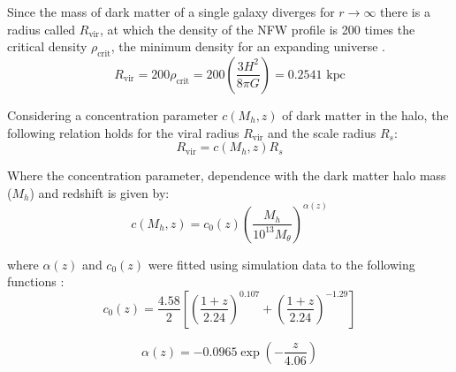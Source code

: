 		
		Since the mass of dark matter of a single galaxy diverges for $r \rightarrow \infty$ there is a radius called $R_\text{vir}$, at which the density of the NFW profile is 200 times the critical density $\rho_\text{crit}$, the minimum density for an expanding universe .
		\begin{equation}
			R_\text{vir} = 200 \rho_\text{crit} = 200 \left(\dfrac{3H^2}{8\pi G}\right) = 0.2541 \text{ kpc}
		\end{equation}
		
		Considering a concentration parameter $c(M_h, z)$ of dark matter in the halo, the following relation holds for the viral radius $R_\text{vir}$ and the scale radius $R_s$:
		\begin{equation}\label{eq: viralRadius}
			R_\text{vir} = c(M_h, z)R_s
		\end{equation}
		
		Where the concentration parameter, dependence with the dark matter halo mass ($M_h$) and redshift is given by: 
		\begin{equation}
		c(M_h, z) = c_0(z)\left(\dfrac{M_h}{10^{13}M_\theta}\right)^{\alpha(z)}
		\end{equation}
		
		where $\alpha(z)$ and $c_0(z)$ were fitted using simulation data to the following functions \cite{choksi2017recoiling}:
		\begin{equation}
		c_0(z) = \dfrac{4.58}{2}\left[\left(\dfrac{1 + z}{2.24}\right)^{0.107} + \left(\dfrac{1 + z}{2.24}\right)^{-1.29}\right]
		\end{equation}
		
		\begin{equation}
		\alpha(z) = -0.0965 \exp\left(-\dfrac{z}{4.06}\right)
		\end{equation}
		
	
